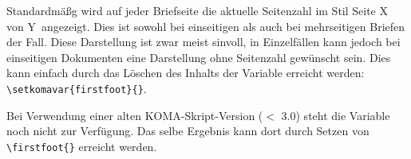 Standardmäßg wird auf jeder Briefseite die aktuelle Seitenzahl
im Stil \glqq Seite X von Y\grqq\ angezeigt. Dies ist sowohl bei einseitigen
als auch bei mehrseitigen Briefen der Fall.
Diese Darstellung ist zwar meist sinvoll, in Einzelfällen kann jedoch bei
einseitigen Dokumenten eine Darstellung ohne Seitenzahl gewünscht sein.
Dies kann einfach durch das Löschen des Inhalts der Variable
 erreicht werden: \lstinline!\setkomavar{firstfoot}{}!.

\begin{important}
  Bei Verwendung einer alten KOMA-Skript-Version ($<$ 3.0) steht die
  Variable  noch nicht zur Verfügung.
  Das selbe Ergebnis kann dort durch Setzen von \lstinline!\firstfoot{}!
  erreicht werden.
\end{important}



